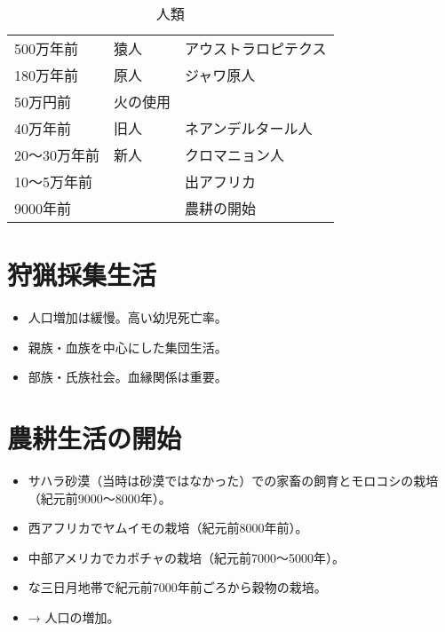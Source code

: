 \documentclass[autodetect-engine,dvipdfmx-if-dvi,ja=standard]{bxjsarticle} \usepackage{mystyle}
\begin{document}

\begin{table}
\caption{人類}
  \centering
  \begin{tabular}{l l l}

    500万年前 & 猿人 & アウストラロピテクス \\
    180万年前 & 原人 & ジャワ原人 \\
    50万円前 & 火の使用 & \\
    40万年前 & 旧人 & ネアンデルタール人 \\
    20〜30万年前 & 新人 & クロマニョン人 \\
    10〜5万年前 & & 出アフリカ \\
    9000年前 & & 農耕の開始 \\

                     
                       
    
  \end{tabular}
\end{table}


\fi

\section{狩猟採集生活}
\begin{itemize}
\item 人口増加は緩慢。高い幼児死亡率。
\item   親族・血族を中心にした集団生活。
\item 部族・氏族社会。血縁関係は重要。
\end{itemize}



\section{農耕生活の開始}

\begin{itemize}
  
\item サハラ砂漠（当時は砂漠ではなかった）での家畜の飼育とモロコシの栽培（紀元前9000〜8000年）。
\item 西アフリカでヤムイモの栽培（紀元前8000年前）。
\item 中部アメリカでカボチャの栽培（紀元前7000〜5000年）。
\item {}な三日月地帯で紀元前7000年前ごろから穀物の栽培。
\item → 人口の増加。
\end{itemize}
\end{document}
